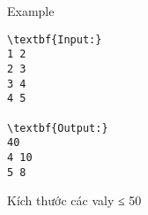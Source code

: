 Example
\begin{verbatim}
\textbf{Input:}
1 2
2 3
3 4
4 5

\textbf{Output:}
40
4 10
5 8\end{verbatim}

Kích thước các valy ≤ 50

 